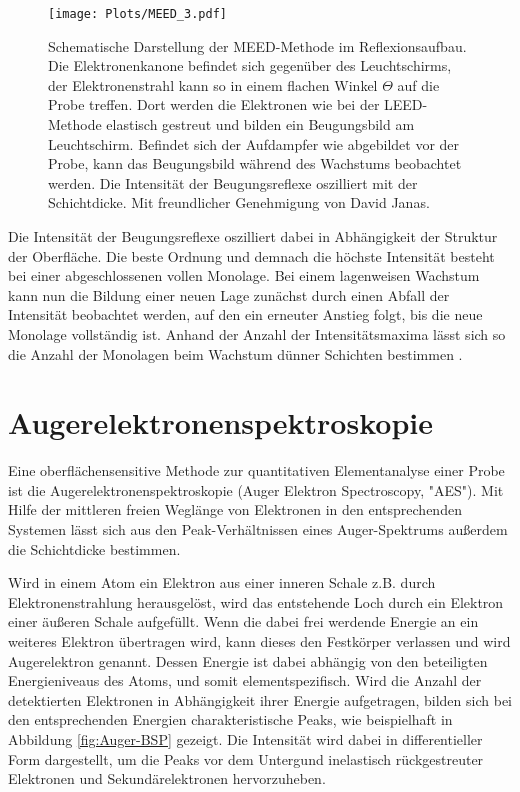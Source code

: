 \begin{figure}[H]
        \centering
        \texttt{[image: Plots/MEED\_3.pdf]}
        \caption{Schematische Darstellung der MEED-Methode im Reflexionsaufbau. Die Elektronenkanone befindet sich gegenüber des
                Leuchtschirms, der Elektronenstrahl kann so in einem flachen Winkel $\Theta$ auf die Probe treffen.
                Dort werden die Elektronen wie bei der LEED-Methode elastisch gestreut und bilden ein Beugungsbild am Leuchtschirm.
                Befindet sich der Aufdampfer \cite{FOCUS} wie abgebildet vor der Probe, kann das Beugungsbild 
                während des Wachstums beobachtet werden. Die Intensität der Beugungsreflexe oszilliert mit der Schichtdicke.
                Mit freundlicher Genehmigung von David Janas.}
        \label{fig:MEEDS}
\end{figure}

Die Intensität der Beugungsreflexe oszilliert dabei in Abhängigkeit der Struktur der Oberfläche.
Die beste Ordnung und demnach die höchste Intensität besteht bei einer abgeschlossenen vollen Monolage.
Bei einem lagenweisen Wachstum kann nun die Bildung einer neuen Lage zunächst durch einen Abfall der Intensität beobachtet werden, 
auf den ein erneuter Anstieg folgt, bis die neue Monolage vollständig ist. Anhand der Anzahl der Intensitätsmaxima lässt sich so die
Anzahl der Monolagen beim Wachstum dünner Schichten bestimmen \cite{neave1983dynamics}. 




\newpage
\section{Augerelektronenspektroskopie}
\label{sec:Auger}
Eine oberflächensensitive Methode zur quantitativen Elementanalyse einer Probe ist die Augerelektronenspektroskopie (Auger Elektron Spectroscopy, "AES").
Mit Hilfe der mittleren freien Weglänge von Elektronen in den entsprechenden Systemen lässt sich aus den Peak-Verhältnissen eines Auger-Spektrums außerdem die Schichtdicke bestimmen.

Wird in einem Atom ein Elektron aus einer inneren Schale z.B. durch Elektronenstrahlung herausgelöst,
wird das entstehende Loch durch ein Elektron einer äußeren Schale aufgefüllt. 
Wenn die dabei frei werdende Energie an ein weiteres Elektron übertragen wird,
kann dieses den Festkörper verlassen und wird Augerelektron genannt.
Dessen Energie ist dabei abhängig von den beteiligten Energieniveaus des Atoms, und somit elementspezifisch.
Wird die Anzahl der detektierten Elektronen in Abhängigkeit ihrer Energie aufgetragen, bilden sich bei den entsprechenden Energien 
charakteristische Peaks, wie beispielhaft in Abbildung \ref{fig:Auger-BSP} gezeigt. Die Intensität wird dabei in differentieller Form dargestellt,
um die Peaks vor dem Untergund inelastisch rückgestreuter Elektronen und Sekundärelektronen hervorzuheben.


